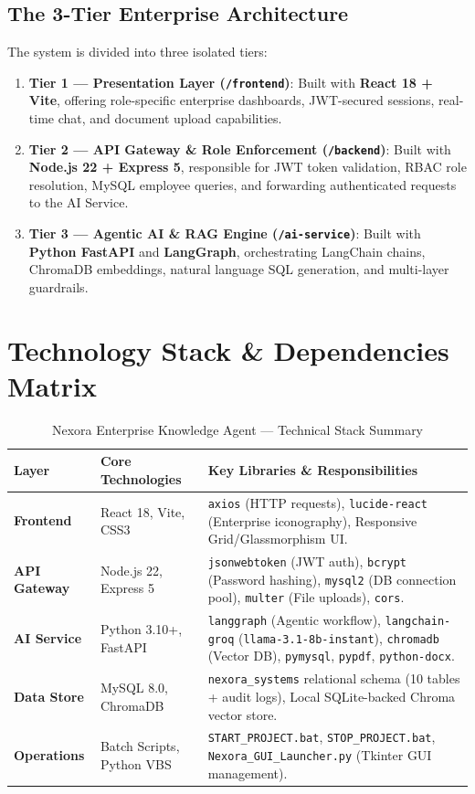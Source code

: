 \documentclass[11pt,a4paper]{article}
\begin{document}
\subsection{The 3-Tier Enterprise Architecture}
The system is divided into three isolated tiers:
\begin{enumerate}
    \item \textbf{Tier 1 — Presentation Layer (\texttt{/frontend})}: Built with \textbf{React 18 + Vite}, offering role-specific enterprise dashboards, JWT-secured sessions, real-time chat, and document upload capabilities.
    \item \textbf{Tier 2 — API Gateway \& Role Enforcement (\texttt{/backend})}: Built with \textbf{Node.js 22 + Express 5}, responsible for JWT token validation, RBAC role resolution, MySQL employee queries, and forwarding authenticated requests to the AI Service.
    \item \textbf{Tier 3 — Agentic AI \& RAG Engine (\texttt{/ai-service})}: Built with \textbf{Python FastAPI} and \textbf{LangGraph}, orchestrating LangChain chains, ChromaDB embeddings, natural language SQL generation, and multi-layer guardrails.
\end{enumerate}

\section{Technology Stack \& Dependencies Matrix}

\begin{table}[h!]
\centering
\small
\begin{tabularx}{\textwidth}{l l X}
\toprule
\textbf{Layer} & \textbf{Core Technologies} & \textbf{Key Libraries \& Responsibilities} \\
\midrule
\textbf{Frontend} & React 18, Vite, CSS3 & \texttt{axios} (HTTP requests), \texttt{lucide-react} (Enterprise iconography), Responsive Grid/Glassmorphism UI. \\
\addlinespace
\textbf{API Gateway} & Node.js 22, Express 5 & \texttt{jsonwebtoken} (JWT auth), \texttt{bcrypt} (Password hashing), \texttt{mysql2} (DB connection pool), \texttt{multer} (File uploads), \texttt{cors}. \\
\addlinespace
\textbf{AI Service} & Python 3.10+, FastAPI & \texttt{langgraph} (Agentic workflow), \texttt{langchain-groq} (\texttt{llama-3.1-8b-instant}), \texttt{chromadb} (Vector DB), \texttt{pymysql}, \texttt{pypdf}, \texttt{python-docx}. \\
\addlinespace
\textbf{Data Store} & MySQL 8.0, ChromaDB & \texttt{nexora\_systems} relational schema (10 tables + audit logs), Local SQLite-backed Chroma vector store. \\
\addlinespace
\textbf{Operations} & Batch Scripts, Python VBS & \texttt{START\_PROJECT.bat}, \texttt{STOP\_PROJECT.bat}, \texttt{Nexora\_GUI\_Launcher.py} (Tkinter GUI management). \\
\bottomrule
\end{tabularx}
\caption{Nexora Enterprise Knowledge Agent — Technical Stack Summary}
\end{table}
\end{document}
